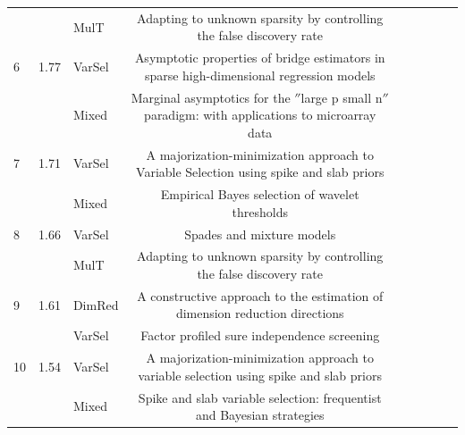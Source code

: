 \documentclass{article}
\begin{document}
\begin{landscape}
\begin{table}[t]
\begin{tabular}{lclclclcl}
     &                           & MulT      & Adapting to unknown sparsity by controlling the false discovery rate                          &                                                             \\
6    & 1.77                      & VarSel    & Asymptotic properties of bridge estimators in sparse high-dimensional regression models       &                                                             \\
     &                           & Mixed     & Marginal asymptotics for the $''$large p small n$''$ paradigm: with applications to microarray data                                                 &  \\
7    & 1.71                      & VarSel    & A majorization-minimization approach to Variable Selection using spike and slab priors        &                                                             \\
     &                           & Mixed     & Empirical Bayes selection of wavelet thresholds                                           &                                                             \\
8    & 1.66                      & VarSel    & Spades and mixture models                                                                     &                                                             \\
     &                           & MulT      & Adapting to unknown sparsity by controlling the false discovery rate                          &                                                             \\
9    & 1.61                      & DimRed    & A constructive approach to the estimation of dimension reduction directions                   &                                                             \\
     &                           & VarSel    & Factor profiled sure independence screening                                                   &                                                             \\
10   & 1.54                      & VarSel    & A majorization-minimization approach to variable selection using spike and slab priors        &                                                             \\
     &                           & Mixed     & Spike and slab variable selection: frequentist and Bayesian strategies                        &                                                             \\

\end{tabular}
\end{table}
\end{landscape}
\end{document}
